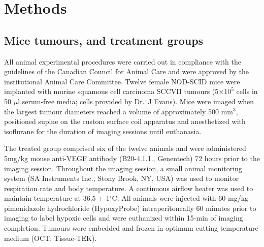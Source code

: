 \section{Methods}
\subsection{Mice tumours, and treatment groups}

All animal experimental procedures were carried out in compliance with the guidelines of the Canadian Council for Animal Care and were approved by the institutional Animal Care Committee. 
Twelve female NOD-SCID mice were implanted with murine squamous cell carcinoma SCCVII tumours (5$\times10^5$ cells in 50 $\mu$l serum-free media; cells provided by Dr.\ J Evans).
Mice were imaged when the largest tumour diameters reached a volume of approximately 500 mm$^3$, positioned supine on the custom surface coil apparatus and anesthetized with isoflurane for the duration of imaging sessions until euthanasia.

The treated group comprised six of the twelve animals and were administered 5mg/kg mouse anti-VEGF antibody (B20-4.1.1., Genentech) 72 hours prior to the imaging session.
Throughout the imaging session, a small animal monitoring system (SA Instruments Inc., Stony Brook, NY, USA) was used to monitor respiration rate and body temperature. 
A continuous airflow heater was used to maintain temperature at 36.5 $\pm$ 1$^\circ$C.
All animals were injected with 60 mg/kg pimonidazole hydrochloride (HypoxyProbe) intraperitoneally 60 minutes prior to imaging to label hypoxic cells and were euthanized within 15-min of imaging completion.
Tumours were embedded and frozen in optimum cutting temperature medium (OCT; Tissue-TEK).

